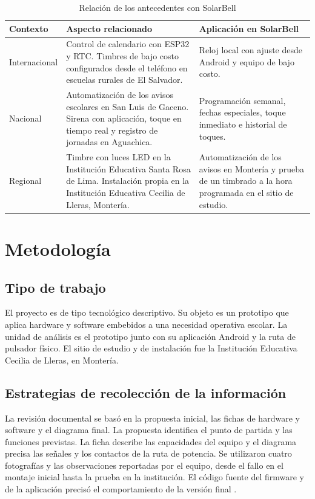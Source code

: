 \documentclass[a4paper,11pt]{article}
\begin{document}
\begin{table}[H]
\centering\small
\caption{Relación de los antecedentes con SolarBell}
\begin{tabularx}{\linewidth}{@{}P{2.65cm}YY@{}}
\toprule
\textbf{Contexto} & \textbf{Aspecto relacionado} & \textbf{Aplicación en SolarBell} \\
\midrule
Internacional & Control de calendario con ESP32 y RTC. Timbres de bajo costo configurados desde el teléfono en escuelas rurales de El Salvador. & Reloj local con ajuste desde Android y equipo de bajo costo. \\
Nacional & Automatización de los avisos escolares en San Luis de Gaceno. Sirena con aplicación, toque en tiempo real y registro de jornadas en Aguachica. & Programación semanal, fechas especiales, toque inmediato e historial de toques. \\
Regional & Timbre con luces LED en la Institución Educativa Santa Rosa de Lima. Instalación propia en la Institución Educativa Cecilia de Lleras, Montería. & Automatización de los avisos en Montería y prueba de un timbrado a la hora programada en el sitio de estudio. \\
\bottomrule
\end{tabularx}
\end{table}

\clearpage
\section{Metodología}
\subsection{Tipo de trabajo}
El proyecto es de tipo tecnológico descriptivo. Su objeto es un prototipo que aplica hardware y software embebidos a una necesidad operativa escolar. La unidad de análisis es el prototipo junto con su aplicación Android y la ruta de pulsador físico. El sitio de estudio y de instalación fue la Institución Educativa Cecilia de Lleras, en Montería.

\subsection{Estrategias de recolección de la información}
La revisión documental se basó en la propuesta inicial, las fichas de hardware y software y el diagrama final. La propuesta identifica el punto de partida y las funciones previstas. La ficha describe las capacidades del equipo y el diagrama precisa las señales y los contactos de la ruta de potencia. Se utilizaron cuatro fotografías y las observaciones reportadas por el equipo, desde el fallo en el montaje inicial hasta la prueba en la institución. El código fuente del firmware y de la aplicación precisó el comportamiento de la versión final \cite{propuesta,ficha,diagrama,evidencia,repo}.
\end{document}
